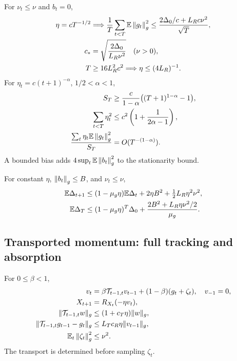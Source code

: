 \begin{corollary}
For $\nu_t\leq\nu$ and $b_t=0$,
\begin{align}
\eta=cT^{-1/2}
&\Longrightarrow
\frac1T\sum_{t<T}\mathbb E\left\lVert g_t\right\rVert_g^2
\leq\frac{2\Delta_0/c+L_Rc\nu^2}{\sqrt T},\\
c_*&=\sqrt{\frac{2\Delta_0}{L_R\nu^2}}
\quad(\nu>0),\\
T&\geq16L_R^2c^2\Longrightarrow\eta\leq(4L_R)^{-1}.
\end{align}
For $\eta_t=c(t+1)^{-\alpha}$, $1/2<\alpha<1$,
\begin{align}
S_T&\geq\frac{c}{1-\alpha}\bigl((T+1)^{1-\alpha}-1\bigr),\\
\sum_{t<T}\eta_t^2&\leq c^2\left(1+\frac1{2\alpha-1}\right),\\
\frac{\sum_t\eta_t\mathbb E\left\lVert g_t\right\rVert_g^2}{S_T}
&=O(T^{-(1-\alpha)}).
\end{align}
A bounded bias adds $4\sup_t\mathbb E\left\lVert b_t\right\rVert_g^2$ to the stationarity bound.
\end{corollary}

\begin{corollary}
\label{cor:stochastic-pl}
For constant $\eta$, $\left\lVert b_t\right\rVert_g\leq B$, and $\nu_t\leq\nu$,
\begin{align}
\mathbb E\Delta_{t+1}
&\leq(1-\mu_g\eta)\mathbb E\Delta_t
+2\eta B^2+\tfrac12L_R\eta^2\nu^2,\\
\mathbb E\Delta_T
&\leq(1-\mu_g\eta)^T\Delta_0+
\frac{2B^2+L_R\eta\nu^2/2}{\mu_g}.
\end{align}
\end{corollary}

\subsection{Transported momentum: full tracking and absorption}
\begin{assumption}
For $0\leq\beta<1$,
\begin{align}
v_t&=\beta\mathcal T_{t-1,t}v_{t-1}
+(1-\beta)(g_t+\zeta_t),\quad v_{-1}=0,\\
X_{t+1}&=R_{X_t}(-\eta v_t),\\
\|\mathcal T_{t-1,t}w\|_g&\leq(1+c_T\eta)\|w\|_g,\\
\|\mathcal T_{t-1,t}g_{t-1}-g_t\|_g
&\leq L_Tc_R\eta\|v_{t-1}\|_g,\\
\mathbb E_t\left\lVert\zeta_t\right\rVert_g^2&\leq\nu^2 .
\label{eq:rigid-momentum-model}
\end{align}
The transport is determined before sampling $\zeta_t$.
\end{assumption}

